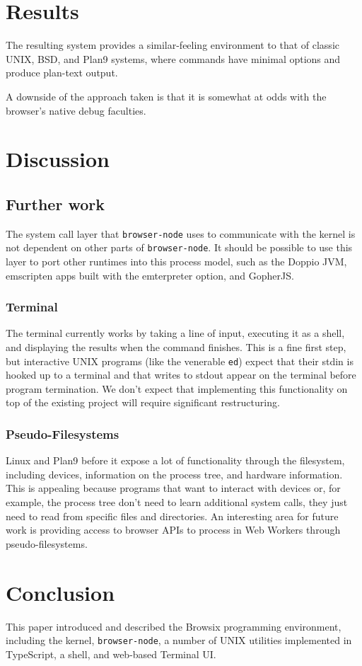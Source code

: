 \documentclass{acm_proc_article-sp}
\begin{document}
\section{Results}

The resulting system provides a similar-feeling environment to that of
classic UNIX, BSD, and Plan9 systems, where commands have minimal
options and produce plan-text output.

A downside of the approach taken is that it is somewhat at odds with
the browser's native debug faculties.

\section{Discussion}

\subsection{Further work}

The system call layer that \texttt{browser-node} uses to communicate
with the kernel is not dependent on other parts of
\texttt{browser-node}.  It should be possible to use this layer to
port other runtimes into this process model, such as the Doppio JVM,
emscripten apps built with the emterpreter option, and GopherJS.

\subsubsection{Terminal}

The terminal currently works by taking a line of input, executing it
as a shell, and displaying the results when the command finishes.
This is a fine first step, but interactive UNIX programs (like the
venerable \texttt{ed}) expect that their stdin is hooked up to a
terminal and that writes to stdout appear on the terminal before
program termination.  We don't expect that implementing this
functionality on top of the existing project will require significant
restructuring.

\subsubsection{Pseudo-Filesystems}

Linux and Plan9 before it expose a lot of functionality through the
filesystem, including devices, information on the process tree, and
hardware information.  This is appealing because programs that want to
interact with devices or, for example, the process tree don't need to
learn additional system calls, they just need to read from specific
files and directories.  An interesting area for future work is
providing access to browser APIs to process in Web Workers through
pseudo-filesystems.

\section{Conclusion}

This paper introduced and described the Browsix programming
environment, including the kernel, \texttt{browser-node}, a number of
UNIX utilities implemented in TypeScript, a shell, and web-based
Terminal UI.




\balancecolumns
\end{document}

